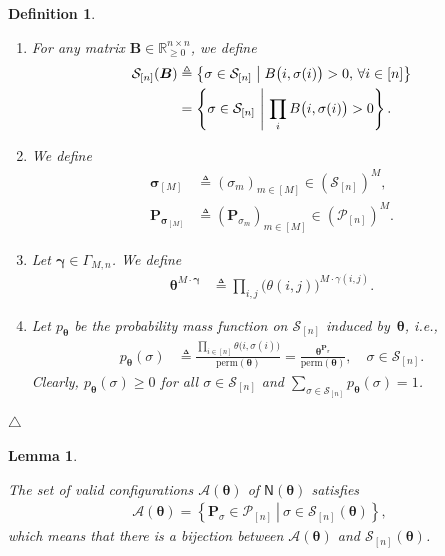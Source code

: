 \documentclass[journal,lettersize,twocolumn]{IEEEtran} %
\newtheorem{lemma}[theorem]{Lemma}
\newtheorem{definition}[theorem]{Definition}
\newcommand{\edefinition}{\hfill$\triangle$}
\newcommand{\vect}[1]{ \bm{#1} }
\newcommand{\set}[1]{\mathcal{#1}}
\newcommand{\vgam}{ \vect{\gamma} }
\newcommand{\sfN}{ \mathsf{N} }
\newcommand{\sR}{\mathbb{R}}
\newcommand{\matr}[1]{ \bm{#1} }
\newcommand{\defeq}{ \triangleq }
\newcommand{\perm}{ \mathrm{perm} }
\newcommand{\pmtheta}{p_{\mtheta}}
\newcommand{\vsigma}{ \bm{\sigma} }
\newcommand{\setP}{\set{P}}
\newcommand{\setS}{\set{S}}
\newcommand{\mtheta}{\matr{\theta}}
\newcommand{\vtheta}{\matr{\theta}}
\newcommand{\mP}{\matr{P}}
\newcommand{\setA}{ \set{A} }
\newcommand{\ie}{\textit{i.e.}}
\begin{document}
\begin{definition}
\begin{enumerate}
   \item For any matrix $ \matr{B} \in \sR^{n \times n}_{\geq 0} $, we define
   \begin{align*}
       \setS_{[n]}(\matr{B})
         &\defeq 
            \bigl\{ 
              \sigma \in \setS_{[n]} 
            \bigm|
              B\bigl( i, \sigma(i) \bigr) > 0, \, \forall i \in [n]
            \bigr\} \\
         &= \left\{ 
              \sigma \in \setS_{[n]} 
            \ \middle| \ 
              \prod_i 
                B\bigl( i, \sigma(i) \bigr) > 0
            \right\}.
   \end{align*}
   
   \item We define 
     \begin{align*}
       \vsigma_{[M]}
         &\defeq
            (\sigma_{m})_{m \in [M]} \in (\setS_{[n]})^{M}, \\
       \mP_{\vsigma_{[M]}}
         &\defeq
            ( \mP_{\sigma_{m}} )_{ m \in [M] } \in (\setP_{[n]})^{M}.
     \end{align*}

   \item Let $ \vgam \in \Gamma_{M,n} $. We define
     \begin{align*}
       \mtheta^{ M \cdot \vgam }
         &\defeq
            \prod_{i,j}
              \bigl(
                \theta(i,j)
              \bigr)^{M \cdot \gamma(i,j)}.
     \end{align*}

   \item Let $\pmtheta$ be the probability mass function on $\setS_{[n]}$
     induced by~$\mtheta$, \ie,
     \begin{align*}
       \pmtheta(\sigma)
         &\defeq
            \frac{ \prod\limits_{i \in [n]} \theta\bigl( i,\sigma(i) \bigr)}
                 { \perm(\mtheta) }
          = \frac{ \mtheta^{\mP_{\sigma}}}
                 { \perm(\mtheta) }, 
                   \quad \sigma \in \setS_{[n]}.
     \end{align*}
     Clearly, $\pmtheta(\sigma) \geq 0$ for all $\sigma \in \setS_{[n]}$ and
     $\sum\limits_{\sigma \in \setS_{[n]}} \pmtheta(\sigma) = 1$.

   \end{enumerate}
  \edefinition
\end{definition}

%

\begin{lemma}
  \label{sec:1:lemma:8}

  The set of valid configurations $ \setA(\mtheta) $ of $\sfN(\mtheta)$
  satisfies
  \begin{align}
    \setA(\mtheta) = 
      \left\{ 
         \left. 
         \mP_{\sigma} \in \setP_{[n]}
      \ \right| \ 
          \sigma \in \setS_{[n]}(\vtheta)
      \right\}, \label{sec:1:eqn:118}
  \end{align}
  which means that there is a bijection between $ \setA(\mtheta) $ and
  $ \setS_{[n]}(\vtheta) $.
\end{lemma}
\end{document}
